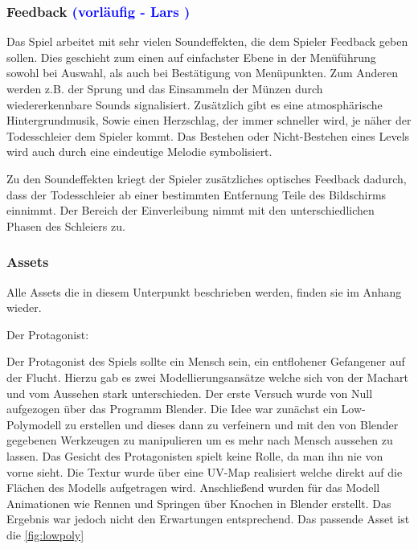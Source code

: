 \documentclass[12pt]{article}
\begin{document}
\vspace{1cm}
\subsubsection{Feedback \textcolor{blue}{(vorläufig - Lars )}}

Das Spiel arbeitet mit sehr vielen Soundeffekten, die dem Spieler Feedback geben sollen. Dies geschieht zum einen auf einfachster Ebene in der Menüführung sowohl bei Auswahl, als auch bei Bestätigung von Menüpunkten. Zum Anderen werden z.B. der Sprung und das Einsammeln der Münzen durch wiedererkennbare Sounds signalisiert.
Zusätzlich gibt es eine atmosphärische Hintergrundmusik, Sowie einen Herzschlag, der immer schneller wird, je näher der Todesschleier dem Spieler kommt. Das Bestehen oder Nicht-Bestehen eines Levels wird auch durch eine eindeutige Melodie symbolisiert. \newline

\noindent Zu den Soundeffekten kriegt der Spieler zusätzliches optisches Feedback dadurch, dass der Todesschleier ab einer bestimmten Entfernung Teile des Bildschirms einnimmt. Der Bereich der Einverleibung nimmt mit den unterschiedlichen Phasen des Schleiers zu. 

\vspace{1cm}
\subsubsection{Assets}

\begin{scriptsize} Alle Assets die in diesem Unterpunkt beschrieben werden, finden sie im Anhang wieder.\end{scriptsize}\newline

\noindent Der Protagonist:\newline

\noindent Der Protagonist des Spiels sollte ein Mensch sein, ein entflohener Gefangener auf der Flucht. 
Hierzu gab es zwei Modellierungsansätze welche sich von der Machart und vom Aussehen stark unterschieden. 
Der erste Versuch wurde von Null aufgezogen über das Programm Blender. Die Idee war zunächst ein Low-Polymodell zu erstellen und dieses dann zu verfeinern
und mit den von Blender gegebenen Werkzeugen zu manipulieren um es mehr nach Mensch aussehen zu lassen. Das Gesicht des Protagonisten spielt keine Rolle,
da man ihn nie von vorne sieht. Die Textur wurde über eine UV-Map realisiert welche direkt auf die Flächen des Modells aufgetragen wird. 
Anschließend wurden für das Modell Animationen wie Rennen und Springen über Knochen in Blender erstellt. Das Ergebnis war jedoch nicht den Erwartungen entsprechend.
Das passende Asset ist die \ref{fig:lowpoly}\newline
\end{document}
